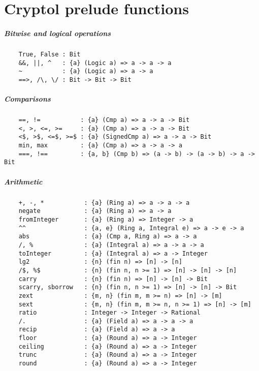\chapter{Cryptol prelude functions}


\paragraph*{Bitwise and logical operations}
\begin{Verbatim}
    True, False : Bit
    &&, ||, ^   : {a} (Logic a) => a -> a -> a
    ~           : {a} (Logic a) => a -> a
    ==>, /\, \/ : Bit -> Bit -> Bit
\end{Verbatim}
\paragraph*{Comparisons}
\begin{Verbatim}
    ==, !=           : {a} (Cmp a) => a -> a -> Bit
    <, >, <=, >=     : {a} (Cmp a) => a -> a -> Bit
    <$, >$, <=$, >=$ : {a} (SignedCmp a) => a -> a -> Bit
    min, max         : {a} (Cmp a) => a -> a -> a
    ===, !==         : {a, b} (Cmp b) => (a -> b) -> (a -> b) -> a -> Bit
\end{Verbatim}
\paragraph*{Arithmetic}
\begin{Verbatim}
    +, -, *           : {a} (Ring a) => a -> a -> a
    negate            : {a} (Ring a) => a -> a
    fromInteger       : {a} (Ring a) => Integer -> a
    ^^                : {a, e} (Ring a, Integral e) => a -> e -> a
    abs               : {a} (Cmp a, Ring a) => a -> a
    /, %              : {a} (Integral a) => a -> a -> a
    toInteger         : {a} (Integral a) => a -> Integer
    lg2               : {n} (fin n) => [n] -> [n]
    /$, %$            : {n} (fin n, n >= 1) => [n] -> [n] -> [n]
    carry             : {n} (fin n) => [n] -> [n] -> Bit
    scarry, sborrow   : {n} (fin n, n >= 1) => [n] -> [n] -> Bit
    zext              : {m, n} (fin m, m >= n) => [n] -> [m]
    sext              : {m, n} (fin m, m >= n, n >= 1) => [n] -> [m]
    ratio             : Integer -> Integer -> Rational
    /.                : {a} (Field a) => a -> a -> a
    recip             : {a} (Field a) => a -> a
    floor             : {a} (Round a) => a -> Integer
    ceiling           : {a} (Round a) => a -> Integer
    trunc             : {a} (Round a) => a -> Integer
    round             : {a} (Round a) => a -> Integer
\end{Verbatim}
